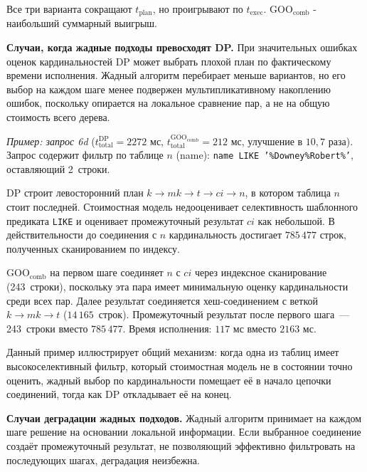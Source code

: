 Все три варианта сокращают $t_{\mathrm{plan}}$,
но проигрывают по $t_{\mathrm{exec}}$.
$\mathrm{GOO_{comb}}$ - наибольший суммарный выигрыш.
\par

\textbf{Случаи, когда жадные подходы превосходят DP.}
При значительных ошибках оценок кардинальностей DP может выбрать плохой план по фактическому времени исполнения.
Жадный алгоритм перебирает меньше вариантов, но его выбор на каждом шаге
менее подвержен мультипликативному накоплению ошибок, поскольку опирается
на локальное сравнение пар, а не на общую стоимость всего дерева.
\par

\textit{Пример: запрос 6d}
($t_{\mathrm{total}}^{\mathrm{DP}} = 2272$ мс,
$t_{\mathrm{total}}^{\mathrm{GOO_{comb}}} = 212$ мс, улучшение в $10{,}7$ раза).
Запрос содержит фильтр по таблице $n$ (name):
\texttt{name LIKE '\%Downey\%Robert\%'}, оставляющий 2~строки.
\par

DP строит левосторонний план $k \to mk \to t \to ci \to n$,
в котором таблица $n$ стоит последней.
Стоимостная модель недооценивает селективность шаблонного предиката \texttt{LIKE}
и оценивает промежуточный результат $ci$ как небольшой.
В действительности до соединения с $n$ кардинальность достигает
$785\,477$ строк, полученных сканированием по индексу.
\par

$\mathrm{GOO_{comb}}$ на первом шаге соединяет $n$ с $ci$ через индексное сканирование (243~строки),
поскольку эта пара имеет минимальную оценку кардинальности среди всех пар.
Далее результат соединяется хеш-соединением с веткой $k \to mk \to t$ ($14\,165$~строк).
Промежуточный результат после первого шага~--- 243~строки вместо $785\,477$.
Время исполнения: $117$ мс вместо $2163$ мс.
\par

Данный пример иллюстрирует общий механизм: когда одна из таблиц имеет
высокоселективный фильтр, который стоимостная модель не в состоянии
точно оценить, жадный выбор по кардинальности помещает её в начало
цепочки соединений, тогда как DP откладывает её на конец.
\par

\textbf{Случаи деградации жадных подходов.}
Жадный алгоритм принимает на каждом шаге решение
на основании локальной информации.
Если выбранное соединение создаёт промежуточный результат,
не позволяющий эффективно фильтровать на последующих шагах,
деградация неизбежна.
\par

